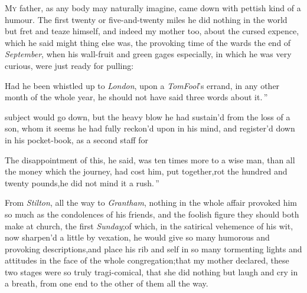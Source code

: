 \documentclass{article}
\begin{document}
\lettrine{M}{y} father, as any body may naturally
imagine, came down with\break
{}
pettish kind of a humour. The first twenty or five-and-twenty miles
he did nothing in the world but fret and teaze himself, and
indeed my mother too, about the cursed expence, which he said might\break
{}\break
{}\pb 
thing else was, the provoking time of the
wards the end of
\textit{September}, when his wall-fruit and green gages especially,
in which he was very curious, were just ready for
pulling:\tsh  
\begin{story}{Had he been}
whistled up to
    \textit{London}, upon a \textit{Tom}\break\textit{Fool}’s errand, in any other
month of the whole year, he should not have said three words about
it.\,”
\end{story}

\vspace\parskip
\noindent
{}
subject would go down, but the heavy blow he
had sustain’d from the loss of a son, whom it seems he had fully
reckon’d upon in his mind, and register’d down in his pocket-book,
as a second staff for 
\begin{story}{The disappointment of this, he said,}
    was ten times more to a wise man,
than all the money which the journey, \etc\pb had cost him, put
together,\tsk  rot the hundred and twenty pounds,\tsh  he did not mind
it a rush.\,”
\end{story}

\vspace\parskip

From \textit{Stilton}, all the way to \textit{Grantham}, nothing in
the whole affair provoked him so much as the condolences of his
friends, and the foolish figure they should both make at church,
the first \textit{Sunday};\tsh\break  of which, in the satirical
vehemence of his wit, now sharpen’d a little by vexation, he
would give so many humorous and provoking descriptions,\tsk  and
place his rib and self in so many tormenting lights and attitudes
in the face of the whole congregation;\tsk  that my mother
declared, these two stages were so truly tragi-comical, that she
did nothing but laugh and cry in a breath, from one end to the
other of them all the way.
\end{document}
